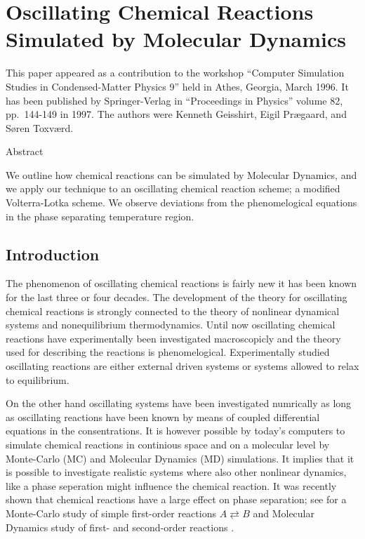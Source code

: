\chapter{Oscillating Chemical Reactions Simulated by Molecular Dynamics}
\label{Paper:csp96}

This paper appeared as a contribution to the workshop ``Computer
Simulation Studies in Condensed-Matter Physics 9'' held in Athes,
Georgia, March 1996. It has been published by Springer-Verlag in
``Proceedings in Physics'' volume 82, pp.\ 144-149 in 1997. The
authors were Kenneth Geisshirt, Eigil Pr{\ae}gaard, and S{\o}ren
Toxv{\ae}rd.



\begin{center}
Abstract

We outline how chemical reactions can be simulated by Molecular Dynamics,
and we apply our technique to an oscillating chemical reaction scheme;
a modified Volterra-Lotka scheme. We observe deviations from the
phenomelogical equations in the phase separating temperature region.
\end{center}

\section{Introduction}
The phenomenon of oscillating chemical reactions is fairly new \ie it
has been known for the last three or four decades. The development
of the theory for oscillating chemical reactions is strongly connected to 
the theory of nonlinear dynamical systems and nonequilibrium 
thermodynamics. Until now oscillating chemical
reactions have experimentally been investigated macroscopicly and
the theory used for describing the reactions is
phenomelogical. Experimentally stu\-died oscillating reactions are
either external driven systems or systems allowed to relax to
equilibrium. 

On the other hand oscillating systems have been investigated
numrically as long as oscillating reactions have been known by means
of coupled differential equations in the consentrations. It is however
possible by today's computers to simulate chemical reactions in
continious space and on a molecular level by Monte-Carlo (MC) and
Molecular Dynamics (MD) simulations. It implies that it is possible to
investigate realistic systems where also other nonlinear dynamics,
like a phase seperation might influence the chemical reaction. It was
recently shown that chemical reactions have a large effect on phase  
separation; see \eg \cite{glotzer} for a Monte-Carlo study of simple 
first-order reactions $A \rightleftarrows B$ and Molecular Dynamics study of
first- and second-order reactions \cite{tox2}. 


